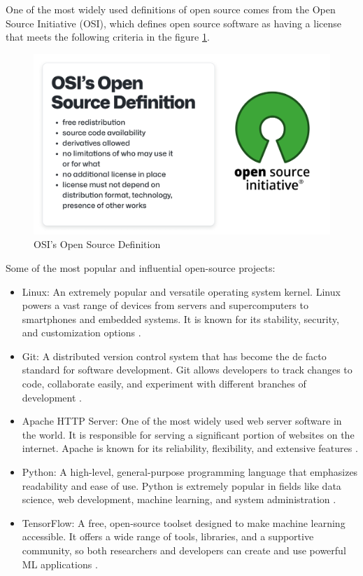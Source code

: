 One of the most widely used definitions of open source comes from the Open Source Initiative (OSI), which defines open source software as having a license that meets the following criteria in the figure \ref{fig:osidef}.

\begin{figure}[ht]
\includegraphics[width=12cm]{figs/osiopensourcedef.png}
\centering
\caption{OSI's Open Source Definition \cite{HaeussgeDevGuide}}
\label{fig:osidef}
\end{figure}



Some of the most popular and influential open-source projects:
\begin{itemize}
    \item Linux: An extremely popular and versatile operating system kernel. Linux powers a vast range of devices from servers and supercomputers to smartphones and embedded systems. It is known for its stability, security, and customization options \cite{fink2003business}. 
    \item Git: A distributed version control system that has become the de facto standard for software development. Git allows developers to track changes to code, collaborate easily, and experiment with different branches of development \cite{loeliger2012version}.  
    \item Apache HTTP Server: One of the most widely used web server software in the world. It is responsible for serving a significant portion of websites on the internet. Apache is known for its reliability, flexibility, and extensive features \cite{fielding1997apache}. 
    \item Python: A high-level, general-purpose programming language that emphasizes readability and ease of use. Python is extremely popular in fields like data science, web development, machine learning, and system administration \cite{srinath2017python}. 
    \item TensorFlow: A free, open-source toolset designed to make machine learning accessible. It offers a wide range of tools, libraries, and a supportive community, so both researchers and developers can create and use powerful ML applications \cite{developers2022tensorflow}.  
\end{itemize}

